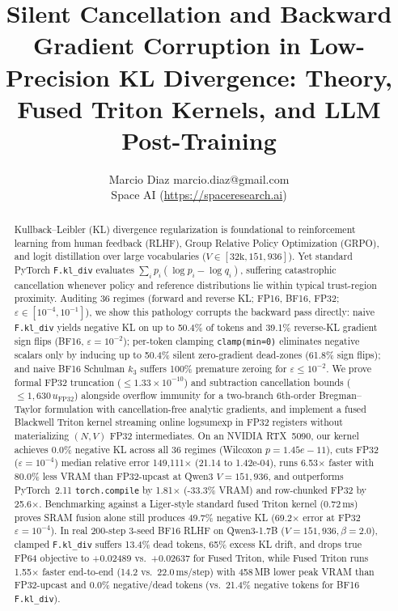 \documentclass[10pt]{article}
\title{Silent Cancellation and Backward Gradient Corruption in Low-Precision KL Divergence: Theory, Fused Triton Kernels, and LLM Post-Training}
\author{\name Marcio Diaz \email marcio.diaz@gmail.com \\
\addr Space AI (\url{https://spaceresearch.ai})}
\begin{document}
\maketitle
\begin{abstract}
Kullback--Leibler (KL) divergence regularization is foundational to reinforcement learning from human feedback (RLHF), Group Relative Policy Optimization (GRPO), and logit distillation over large vocabularies ($V \in [32\text{k}, 151{,}936]$). Yet standard PyTorch \texttt{F.kl\_div} evaluates $\sum_i p_i (\log p_i - \log q_i)$, suffering catastrophic cancellation whenever policy and reference distributions lie within typical trust-region proximity. Auditing 36 regimes (forward and reverse KL; FP16, BF16, FP32; $\varepsilon \in [10^{-4}, 10^{-1}]$), we show this pathology corrupts the backward pass directly: naive \texttt{F.kl\_div} yields negative KL on up to 50.4\% of tokens and 39.1\% reverse-KL gradient sign flips (BF16, $\varepsilon=10^{-2}$); per-token clamping \texttt{clamp(min=0)} eliminates negative scalars only by inducing up to 50.4\% silent zero-gradient dead-zones (61.8\% sign flips); and naive BF16 Schulman $k_3$ suffers 100\% premature zeroing for $\varepsilon \le 10^{-2}$. We prove formal FP32 truncation ($\le 1.33\times 10^{-10}$) and subtraction cancellation bounds ($\le 1{,}630\,u_{\mathrm{FP32}}$) alongside overflow immunity for a two-branch 6th-order Bregman--Taylor formulation with cancellation-free analytic gradients, and implement a fused Blackwell Triton kernel streaming online logsumexp in FP32 registers without materializing $(N,V)$ FP32 intermediates. On an NVIDIA RTX~5090, our kernel achieves 0.0\% negative KL across all 36 regimes (Wilcoxon $p=1.45e-11$), cuts FP32 ($\varepsilon=10^{-4}$) median relative error 149,111$\times$ (21.14 to 1.42e-04), runs 6.53$\times$ faster with 80.0\% less VRAM than FP32-upcast at Qwen3 $V=151{,}936$, and outperforms PyTorch~2.11 \texttt{torch.compile} by 1.81$\times$ (-33.3\% VRAM) and row-chunked FP32 by 25.6$\times$. Benchmarking against a Liger-style standard fused Triton kernel (0.72\,ms) proves SRAM fusion alone still produces 49.7\% negative KL (69.2$\times$ error at FP32 $\varepsilon=10^{-4}$). In real 200-step 3-seed BF16 RLHF on Qwen3-1.7B ($V=151{,}936, \beta=2.0$), clamped \texttt{F.kl\_div} suffers 13.4\% dead tokens, 65\% excess KL drift, and drops true FP64 objective to +0.02489 vs.\ +0.02637 for Fused Triton, while Fused Triton runs 1.55$\times$ faster end-to-end (14.2 vs.\ 22.0\,ms/step) with 458\,MB lower peak VRAM than FP32-upcast and 0.0\% negative/dead tokens (vs.\ 21.4\% negative tokens for BF16 \texttt{F.kl\_div}).
\end{abstract}
\end{document}
